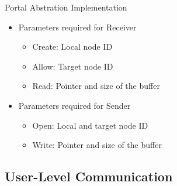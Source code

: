 		\begin{frame}[fragile]{Portal Abstration Implementation}
			\begin{itemize}
				\item Parameters required for Receiver
				\begin{itemize}
					\item Create: Local node ID
					\item Allow: Target node ID
					\item Read: Pointer and size of the buffer
				\end{itemize}
				\item Parameters required for Sender
				\begin{itemize}
					\item Open: Local and target node ID
					\item Write: Pointer and size of the buffer
				\end{itemize}
			\end{itemize}


		\end{frame}

	\subsection{User-Level Communication}

